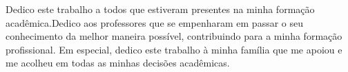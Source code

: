 Dedico este trabalho a todos que estiveram presentes na minha formação acadêmica.Dedico aos professores que se empenharam em passar o seu conhecimento da melhor maneira possível, contribuindo para  a minha formação profissional. Em especial, dedico este trabalho à minha família que me apoiou e me acolheu em todas as minhas decisões acadêmicas.